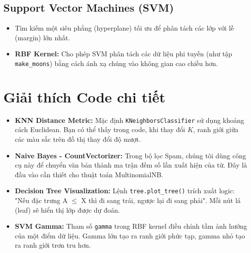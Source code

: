 \documentclass{article}
\begin{document}
\subsection{Support Vector Machines (SVM)}
\begin{itemize}
    \item Tìm kiếm một siêu phẳng (hyperplane) tối ưu để phân tách các lớp với lề (margin) lớn nhất.
    \item \textbf{RBF Kernel:} Cho phép SVM phân tách các dữ liệu phi tuyến (như tập \texttt{make\_moons}) bằng cách ánh xạ chúng vào không gian cao chiều hơn.
\end{itemize}

\section{Giải thích Code chi tiết}
\begin{itemize}
    \item \textbf{KNN Distance Metric:} Mặc định \texttt{KNeighborsClassifier} sử dụng khoảng cách Euclidean. Bạn có thể thấy trong code, khi thay đổi $K$, ranh giới giữa các màu sắc trên đồ thị thay đổi độ mượt.
    \item \textbf{Naive Bayes - CountVectorizer:} Trong bộ lọc Spam, chúng tôi dùng công cụ này để chuyển văn bản thành ma trận đếm số lần xuất hiện của từ. Đây là đầu vào cần thiết cho thuật toán MultinomialNB.
    \item \textbf{Decision Tree Visualization:} Lệnh \texttt{tree.plot\_tree()} trích xuất logic: "Nếu đặc trưng A $\le$ X thì đi sang trái, ngược lại đi sang phải". Mỗi nút lá (leaf) sẽ hiển thị lớp được dự đoán.
    \item \textbf{SVM Gamma:} Tham số \texttt{gamma} trong RBF kernel điều chỉnh tầm ảnh hưởng của một điểm dữ liệu. Gamma lớn tạo ra ranh giới phức tạp, gamma nhỏ tạo ra ranh giới trơn tru hơn.
\end{itemize}
\end{document}

